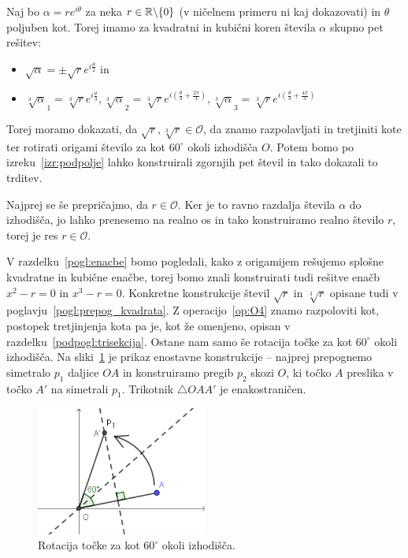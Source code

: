 \begin{dokaz}
    Naj bo $\alpha = r e^{i \theta}$ za neka $r \in \mathbb R \backslash \{0\}$ (v ničelnem primeru ni kaj dokazovati) in $\theta$ poljuben kot. Torej imamo za kvadratni in kubični koren števila $\alpha$ skupno pet rešitev:
    \begin{itemize}
        \item $\sqrt{\alpha} = \pm \sqrt{r}e^{i \frac{\theta}{2}}$ in
        \item $\sqrt[3]{\alpha}_1 = \sqrt[3]{r}e^{i \frac{\theta}{3}}, \sqrt[3]{\alpha}_2 = \sqrt[3]{r}e^{i \left(\frac{\theta}{3} + \frac{2\pi}{3}\right)}, \sqrt[3]{\alpha}_3 = \sqrt[3]{r}e^{i \left(\frac{\theta}{3} + \frac{4\pi}{3}\right)}$
    \end{itemize}
    Torej moramo dokazati, da $\sqrt{r}, \sqrt[3]{r} \in \mathcal{O}$, da znamo razpolavljati in tretjiniti kote ter rotirati origami število za kot $60^\circ$ okoli izhodišča $O$. Potem bomo po izreku~\ref{izr:podpolje} lahko konstruirali zgornjih pet števil in tako dokazali to trditev.

    Najprej se še prepričajmo, da $r \in \mathcal{O}$. Ker je to ravno razdalja števila $\alpha$ do izhodišča, jo lahko prenesemo na realno os in tako konstruiramo realno število $r$, torej je res $r \in \mathcal{O}$.
    
    V razdelku~\ref{pogl:enacbe} bomo pogledali, kako z origamijem rešujemo splošne kvadratne in kubične enačbe, torej bomo znali konstruirati tudi rešitve enačb $x^2 - r = 0$ in $x^3 - r = 0$. Konkretne konstrukcije števil $\sqrt{r}$ in $\sqrt[3]{r}$ opisane tudi v poglavju~\ref{pogl:prepog_kvadrata}. Z operacijo~\ref{op:O4} znamo razpoloviti kot, postopek tretjinjenja kota pa je, kot že omenjeno, opisan v razdelku~\ref{podpogl:trisekcija}. Ostane nam samo še rotacija točke za kot $60^\circ$ okoli izhodišča. Na sliki~\ref{fig:kot60_rotacija} je prikaz enostavne konstrukcije -- najprej prepognemo simetralo $p_1$ daljice $OA$ in konstruiramo pregib $p_2$ skozi $O$, ki točko $A$ preslika v točko $A'$ na simetrali $p_1$. Trikotnik $\triangle OAA'$ je enakostraničen. 
    \begin{figure}[h]
        \centering
        \includegraphics[width=0.5\textwidth]{images/algebra/kot60.png}
        \caption[Rotacija točke okoli izhodišča]{Rotacija točke za kot $60^\circ$ okoli izhodišča.}
        \label{fig:kot60_rotacija}
    \end{figure}
\end{dokaz}

